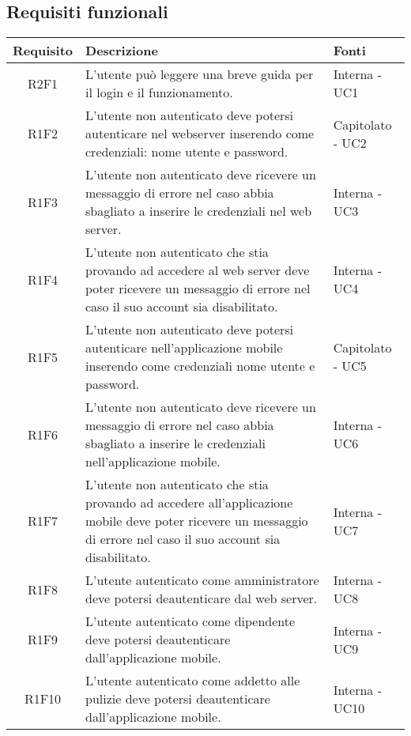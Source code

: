 \subsection{Requisiti funzionali}
\begin{center}
	\begin{longtable}{|c|p{10cm}|p{4cm}|}
		\hline
		\rowcolor{lighter-grayer}
		\textbf{Requisito} & \textbf{Descrizione} & \textbf{Fonti}  \\
		\hline
		\endhead
		
		
		R2F1 & L'utente può leggere una breve guida per il login e il funzionamento. & Interna - UC1 \\
		\hline
		R1F2	&	L'utente non autenticato deve potersi autenticare nel webserver inserendo come credenziali: nome utente e password. & Capitolato - UC2	\\
		\hline
		R1F3	&	L'utente non autenticato deve ricevere un messaggio di errore nel caso abbia sbagliato a inserire le credenziali nel web server.& Interna - UC3	\\
		\hline
		R1F4	&	L'utente non autenticato che stia provando ad accedere al web server deve poter ricevere un messaggio di errore nel caso il suo account sia disabilitato.& Interna - UC4	\\
		\hline
		R1F5	&	L'utente non autenticato deve potersi autenticare nell'applicazione mobile inserendo come credenziali nome utente e password. & Capitolato - UC5	\\
		\hline
		R1F6	&	L'utente non autenticato deve ricevere un messaggio di errore nel caso abbia sbagliato a inserire le credenziali nell'applicazione mobile.& Interna - UC6	\\
		\hline
		R1F7	&	L'utente non autenticato che stia provando ad accedere all'applicazione mobile deve poter ricevere un messaggio di errore nel caso il suo account sia disabilitato.& Interna - UC7	\\
		\hline
		R1F8	&	L'utente autenticato come amministratore deve potersi deautenticare dal web server.& Interna - UC8	\\
		\hline
		R1F9	&	L'utente autenticato come dipendente deve potersi deautenticare dall'applicazione mobile.& Interna - UC9	\\
		\hline
		R1F10	&	L'utente autenticato come addetto alle pulizie deve potersi deautenticare dall'applicazione mobile.& Interna - UC10	\\

\end{longtable}
\end{center}
